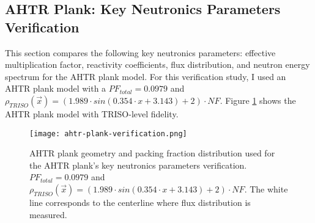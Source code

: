\subsection{AHTR Plank: Key Neutronics Parameters Verification}
\label{sec:plank-knp}
This section compares the following key neutronics parameters: effective 
multiplication factor, reactivity coefficients, flux distribution, and neutron energy 
spectrum for the \gls{AHTR} plank model. 
For this verification study, I used an \gls{AHTR} plank model with a 
$PF_{total} = 0.0979$ and 
$\rho_{TRISO}(\vec{x}) = \left(1.989\cdot sin(0.354\cdot x + 3.143) + 2\right) \cdot NF$. 
Figure \ref{fig:ahtr-plank-verification} shows the \gls{AHTR} plank model with TRISO-level 
fidelity.
 \begin{figure}[htbp]
    \centering
    \texttt{[image: ahtr-plank-verification.png]}
    \raggedright
    \caption{\acrfull{AHTR} plank geometry and packing fraction distribution used for 
    the \gls{AHTR} plank's key neutronics parameters verification. 
    $PF_{total} = 0.0979$ and 
    $\rho_{TRISO}(\vec{x}) = \left(1.989\cdot sin(0.354\cdot x + 3.143) + 2\right) \cdot NF$. 
    The white line corresponds to the centerline where flux distribution is measured. }  
    \label{fig:ahtr-plank-verification}
\end{figure}

